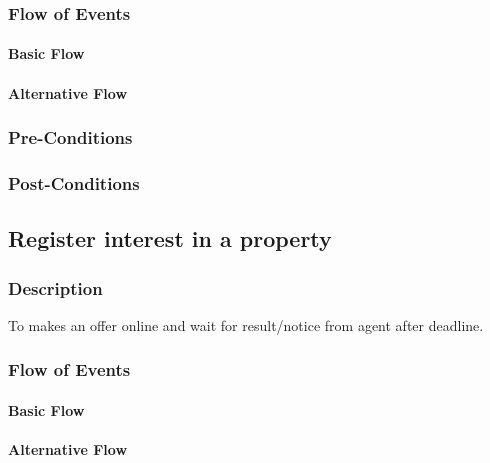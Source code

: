 \documentclass[a4paper,12pt]{article}
\begin{document}
\subsubsection{Flow of Events}
\paragraph{Basic Flow}
\begin{itemize}
\end{itemize}

\paragraph{Alternative Flow}
\begin{itemize}
\end{itemize}

\subsubsection{Pre-Conditions}
\subsubsection{Post-Conditions}

\subsection{Register interest in a property}
\subsubsection{Description}
To makes an offer online and wait for result/notice from agent after deadline.
\subsubsection{Flow of Events}
\paragraph{Basic Flow}
\begin{itemize}
\end{itemize}

\paragraph{Alternative Flow}
\begin{itemize}
\end{itemize}
\end{document}
